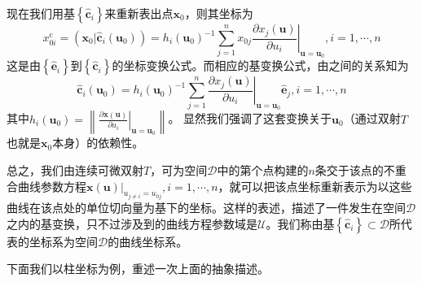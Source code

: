 \documentclass[../main.tex]{subfiles}
\begin{document}
现在我们用基$\left\{\mathbf{\hat{c}}_i\right\}$来重新表出点$\mathbf{x}_0$，则其坐标为
\[x_{0i}^\mathrm{c}=\left(\mathbf{x}_0|\mathbf{\hat{c}}_i\left(\mathbf{u}_0\right)\right)=h_i\left(\mathbf{u}_0\right)^{-1}\sum_{j=1}^nx_{0j}\left.\frac{\partial x_j\left(\mathbf{u}\right)}{\partial u_i}\right|_{\mathbf{u}=\mathbf{u}_0},i=1,\cdots,n\]
这是由$\left\{\mathbf{\hat{e}}_i\right\}$到$\left\{\mathbf{\hat{c}}_i\right\}$的坐标变换公式。而相应的基变换公式，由之间的关系知为
\[\mathbf{\hat{c}}_i\left(\mathbf{u}_0\right)=h_i\left(\mathbf{u}_0\right)^{-1}\sum_{j=1}^n\left.\frac{\partial x_j\left(\mathbf{u}\right)}{\partial u_i}\right|_{\mathbf{u}=\mathbf{u}_0}\mathbf{\hat{e}}_j,i=1,\cdots,n\]
其中$h_i\left(\mathbf{u}_0\right)=\left\|\left.\frac{\partial \mathbf{x}\left(\mathbf{u}\right)}{\partial u_i}\right|_{\mathbf{u}=\mathbf{u}_0}\right\|$。
显然我们强调了这套变换关于$\mathbf{u}_0$（通过双射$T$也就是$\mathbf{x}_0$本身）的依赖性。

总之，我们由连续可微双射$T$，可为空间$\mathcal{D}$中的第个点构建的$n$条交于该点的不重合曲线参数方程$\left.\mathbf{x}\left(\mathbf{u}\right)\right|_{u_{j\neq i}=u_{0j}},i=1,\cdots,n$，就可以把该点坐标重新表示为以这些曲线在该点处的单位切向量为基下的坐标。这样的表述，描述了一件发生在空间$\mathcal{D}$之内的基变换，只不过涉及到的曲线方程参数域是$\mathcal{U}$。我们称由基$\left\{\mathbf{\hat{c}}_i\right\}\subset\mathcal{D}$所代表的坐标系为空间$\mathcal{D}$的曲线坐标系。

下面我们以柱坐标为例，重述一次上面的抽象描述。
\end{document}

